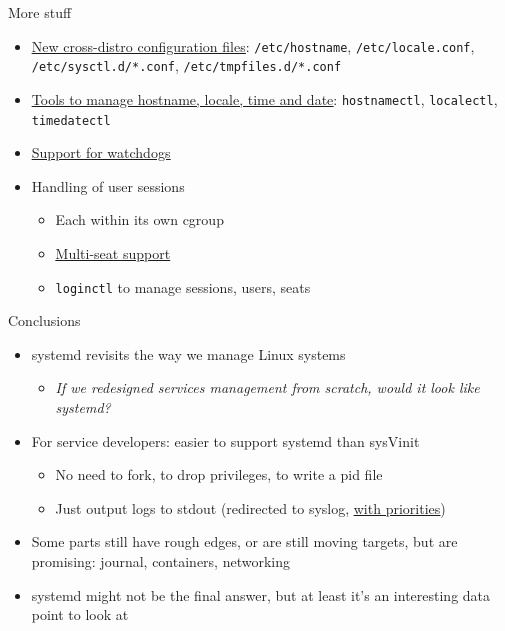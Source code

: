 \documentclass[11pt,final,usepdftitle=false]{beamer}
\begin{document}
\begin{frame}{More stuff}
	\begin{itemize}
		\item \href{http://0pointer.net/blog/projects/the-new-configuration-files.html}{\ul{New cross-distro configuration files}}: \texttt{/etc/hostname}, \texttt{/etc/locale.conf}, \texttt{/etc/sysctl.d/*.conf}, \texttt{/etc/tmpfiles.d/*.conf}
			\hbr
		\item \href{http://www.certdepot.net/rhel7-get-started-systemd/}{\ul{Tools to manage hostname, locale, time and date}}: \texttt{hostnamectl}, \texttt{localectl}, \texttt{timedatectl}
			\hbr
		\item \href{http://0pointer.net/blog/projects/watchdog.html}{\ul{Support for watchdogs}}
			\hbr
		\item Handling of user sessions
			\begin{itemize}
				\item Each within its own cgroup
					\hbr
				\item \href{http://0pointer.net/blog/projects/multi-seat.html}{\ul{Multi-seat support}}
					\hbr
				\item \texttt{loginctl} to manage sessions, users, seats
			\end{itemize}
	\end{itemize}
\end{frame}

\begin{frame}{Conclusions}
	\begin{itemize}
		\item systemd revisits the way we manage Linux systems
			\begin{itemize}
			\item \textsl{If we redesigned services management from scratch, would it look like systemd?}
			\end{itemize}
			\hbr

		\item For service developers: easier to support systemd than sysVinit
					\begin{itemize}
						\item No need to fork, to drop privileges, to write a pid file
							\hbr
						\item Just output logs to stdout (redirected to syslog, \href{http://0pointer.net/blog/projects/journal-submit.html}{\ul{with priorities}})
					\end{itemize}
							\br

		\item Some parts still have rough edges, or are still moving targets, but are promising: journal, containers, networking
			\br
		\item systemd might not be the final answer, but at least it's an interesting data point to look at
	\end{itemize}
\end{frame}
\end{document}
